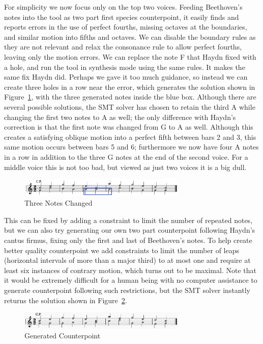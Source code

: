 \documentclass[sigplan,screen]{acmart}
\begin{document}
For simplicity we now focus only on the top two voices. Feeding
Beethoven's notes into the tool as two part first species
counterpoint, it easily finds and reports errors in the use of perfect
fourths, missing octaves at the boundaries, and similar motion into
fifths and octaves. We can disable the boundary rules as they are not
relevant and relax the consonance rule to allow perfect fourths, leaving
only the motion errors. We can replace the note F that Haydn fixed
with a hole, and run the tool in synthesis mode using the same
rules. It makes the same fix Haydn did. Perhaps we gave it too much
guidance, so instead we can create three holes in a row near the
error, which generates the solution shown in
Figure~\ref{fig:b146fix3}, with the three generated notes inside the
blue box. Although there are several possible solutions, the SMT
solver has chosen to retain the third A while changing the first two
notes to A as well; the only difference with Haydn's correction is
that the first note was changed from G to A as well. Although this
creates a satisfying oblique motion into a perfect fifth between bars
2 and 3, this same motion occurs between bars 5 and 6; furthermore we
now have four A notes in a row in addition to the three G notes at the
end of the second voice. For a middle voice this is not too bad, but
viewed as just two voices it is a big dull.

\begin{figure}
  \includegraphics[width=8cm]{figures/b146fix3.png}
  \caption{Three Notes Changed}
  \label{fig:b146fix3}
\end{figure}

This can be fixed by adding a constraint to limit the number of repeated
notes, but we can also try generating our own two part counterpoint
following Haydn's cantus firmus, fixing only the first and last of
Beethoven's notes. To help create better quality counterpoint we add
constraints to limit the number of leaps (horizontal intervals of more
than a major third) to at most one and require at least six instances
of contrary motion, which turns out to be maximal. Note that it would
be extremely difficult for a human being with no computer assistance
to generate counterpoint following such restrictions, but the SMT
solver instantly returns the solution shown in
Figure~\ref{fig:b146gen3}.

\begin{figure}
  \includegraphics[width=8cm]{figures/b146gen3.png}
  \caption{Generated Counterpoint}
  \label{fig:b146gen3}
\end{figure}
\end{document}
